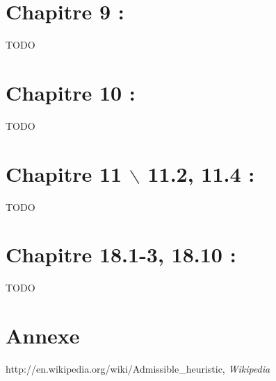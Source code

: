\section{Chapitre 9 : }
TODO

\section{Chapitre 10 : }
TODO

\section{Chapitre 11 $\backslash$ 11.2, 11.4 : }
TODO

\section{Chapitre 18.1-3, 18.10 : }
TODO


\section{Annexe}
%

\begin{thebibliography}{1}
 http://en.wikipedia.org/wiki/Admissible\_heuristic, {\em Wikipedia}
\end{thebibliography}


